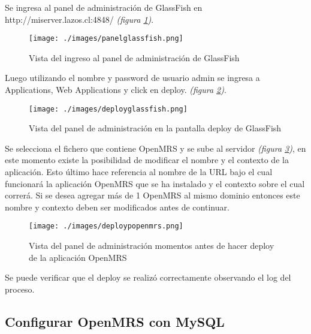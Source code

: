 Se ingresa  al panel de administración de GlassFish en http://miserver.lazos.cl:4848/  \emph{(figura \ref{fig:panelglassfish})}.\newline

\begin{figure}
 \centering
 \texttt{[image: ./images/panelglassfish.png]}
 \caption{Vista del ingreso al panel de administración de GlassFish}
 \label{fig:panelglassfish}
\end{figure}


Luego utilizando el nombre y password de usuario admin se ingresa  a Applications, Web Applications y click  en deploy. \emph{(figura \ref{fig:deployglassfish})}.\newline

\begin{figure}
 \centering
 \texttt{[image: ./images/deployglassfish.png]}
 \caption{Vista del panel de administración en la pantalla deploy de GlassFish}
 \label{fig:deployglassfish}
\end{figure}

Se selecciona el fichero que contiene OpenMRS y se sube al servidor \emph{(figura \ref{fig:deployopenmrscontexto})}, en este momento existe la posibilidad de modificar el nombre y el contexto de la aplicación. Esto último hace referencia al nombre de la URL bajo el cual funcionará la aplicación OpenMRS que se ha instalado  y el contexto sobre el cual correrá. Si se desea agregar más de 1 OpenMRS al mismo dominio entonces este nombre y contexto deben ser modificados  antes de continuar.\newline


\begin{figure}
 \centering
 \texttt{[image: ./images/deploypopenmrs.png]}
 \caption{Vista del panel de administración momentos antes de hacer deploy de la aplicación OpenMRS}
 \label{fig:deployopenmrscontexto}
\end{figure}

Se puede verificar que el deploy se realizó correctamente observando el log del proceso.

\newpage 
\subsection{Configurar OpenMRS con MySQL}

